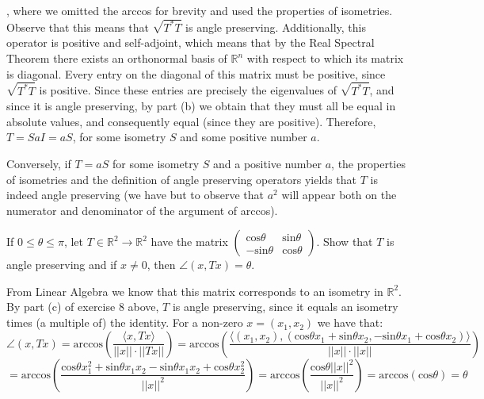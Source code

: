 \begin{solution}
    , where we omitted the arccos for brevity and used the properties of isometries. Observe that this means that $\sqrt{T^*T}$ is angle preserving. Additionally, this operator is positive and self-adjoint, which means that by the Real Spectral Theorem there exists an orthonormal basis of $\mathbb{R}^n$ with respect to which its matrix is diagonal. Every entry on the diagonal of this matrix must be positive, since $\sqrt{T^*T}$ is positive. Since these entries are precisely the eigenvalues of $\sqrt{T^*T}$, and since it is angle preserving, by part (b) we obtain that they must all be equal in absolute values, and consequently equal (since they are positive). Therefore, $T = SaI = aS$, for some isometry $S$ and some positive number $a$.

    Conversely, if $T = aS$ for some isometry $S$ and a positive number $a$, the properties of isometries and the definition of angle preserving operators yields that $T$ is indeed angle preserving (we have but to observe that $a^2$ will appear both on the numerator and denominator of the argument of arccos).

    \end{solution}

    \begin{exercise}{9}
        If $0 \leq \theta \leq \pi$, let $T \in \mathbb{R}^2 \rightarrow \mathbb{R}^2$ have the matrix $\begin{pmatrix}
            \text{cos} \theta & \text{sin} \theta \\ -\text{sin} \theta & \text{cos} \theta
        \end{pmatrix}$. Show that $T$ is angle preserving and if $x \neq 0$, then $\angle(x, Tx) = \theta$.
    \end{exercise}

    \begin{solution}

        From Linear Algebra we know that this matrix corresponds to an isometry in $\mathbb{R}^2$. By part (c) of exercise 8 above, $T$ is angle preserving, since it equals an isometry times (a multiple of) the identity. For a non-zero $x = (x_1, x_2)$ we have that:
        $$\angle(x, Tx) = \text{arccos}(\frac{\langle x, Tx \rangle}{\lvert \lvert x \rvert \rvert \cdot \lvert \lvert Tx \rvert \rvert}) = \text{arccos}(\frac{\langle (x_1, x_2), (\text{cos} \theta x_1 + \text{sin} \theta x_2, -\text{sin} \theta x_1 + \text{cos} \theta x_2) \rangle}{\lvert \lvert x \rvert \rvert \cdot \lvert \lvert x \rvert \rvert})$$
        $$= \text{arccos}(\frac{\text{cos} \theta x_1^2 + \text{sin} \theta x_1x_2 - \text{sin} \theta x_1x_2 + \text{cos} \theta x_2^2}{\lvert \lvert x \rvert \rvert^2}) = \text{arccos}(\frac{\text{cos} \theta \lvert \lvert x \rvert \rvert^2}{\lvert \lvert x \rvert \rvert^2}) = \text{arccos}(\text{cos}\theta) = \theta$$
    \end{solution}

